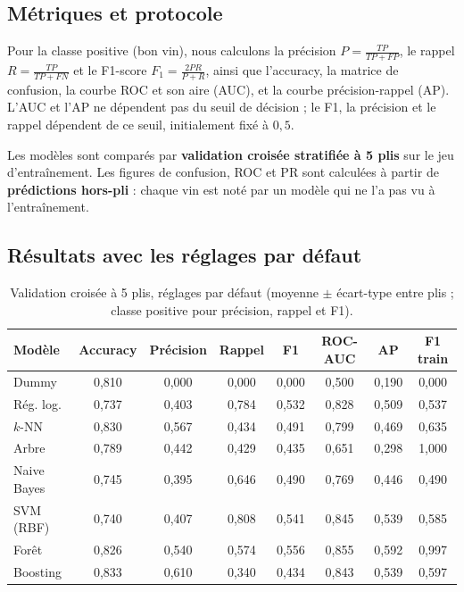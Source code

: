 \documentclass[11pt,a4paper]{article}
\begin{document}
\subsection{Métriques et protocole}

Pour la classe positive (bon vin), nous calculons la précision $P = \frac{TP}{TP+FP}$, le rappel $R = \frac{TP}{TP+FN}$ et le F1-score $F_1 = \frac{2PR}{P+R}$, ainsi que
l'accuracy, la matrice de confusion, la courbe ROC et son aire (AUC), et la courbe précision-rappel (AP). L'AUC et l'AP ne dépendent pas du seuil de décision ; le F1, la précision
et le rappel dépendent de ce seuil, initialement fixé à $0{,}5$.

Les modèles sont comparés par \textbf{validation croisée stratifiée à 5 plis} sur le jeu d'entraînement. Les figures de confusion, ROC et PR sont calculées à partir de
\textbf{prédictions hors-pli} : chaque vin est noté par un modèle qui ne l'a pas vu à l'entraînement.

\subsection{Résultats avec les réglages par défaut}

\begin{table}[htbp]
\centering\small
\caption{Validation croisée à 5 plis, réglages par défaut (moyenne $\pm$ écart-type entre plis ; classe positive pour précision, rappel et F1).}\label{tab:default}
\begin{tabular}{@{}lccccccc@{}}
\toprule
Modèle & Accuracy & Précision & Rappel & F1 & ROC-AUC & AP & F1 train \\
\midrule
Dummy        & 0,810 & 0,000 & 0,000 & 0,000 & 0,500 & 0,190 & 0,000 \\
Rég. log.    & 0,737 & 0,403 & 0,784 & 0,532 & 0,828 & 0,509 & 0,537 \\
$k$-NN       & 0,830 & 0,567 & 0,434 & 0,491 & 0,799 & 0,469 & 0,635 \\
Arbre        & 0,789 & 0,442 & 0,429 & 0,435 & 0,651 & 0,298 & 1,000 \\
Naive Bayes  & 0,745 & 0,395 & 0,646 & 0,490 & 0,769 & 0,446 & 0,490 \\
SVM (RBF)    & 0,740 & 0,407 & 0,808 & 0,541 & 0,845 & 0,539 & 0,585 \\
Forêt        & 0,826 & 0,540 & 0,574 & 0,556 & 0,855 & 0,592 & 0,997 \\
Boosting     & 0,833 & 0,610 & 0,340 & 0,434 & 0,843 & 0,539 & 0,597 \\
\bottomrule
\end{tabular}
\end{table}
\end{document}
